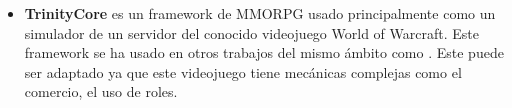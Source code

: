 \begin{itemize}
    \item \textbf{TrinityCore} es un framework de MMORPG usado principalmente como un simulador de un servidor del conocido videojuego World of Warcraft. Este framework se ha usado en otros trabajos del mismo ámbito como \cite{wow-upc}. Este puede ser adaptado ya que este videojuego tiene mecánicas complejas como el comercio, el uso de roles.
\end{itemize}
